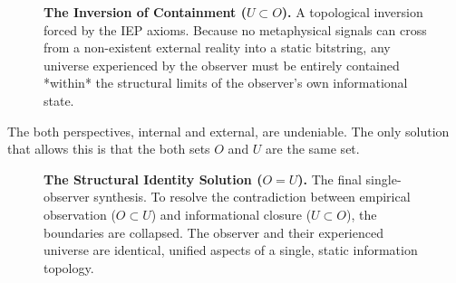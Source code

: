 \begin{figure}[htbp]
\centering
{}
\caption{\textbf{The Inversion of Containment ($U \subset O$).} A topological inversion forced by the IEP axioms. Because no metaphysical signals can cross from a non-existent external reality into a static bitstring, any universe experienced by the observer must be entirely contained *within* the structural limits of the observer's own informational state.}
\label{fig:diag2}
\end{figure}

\newpage

The both perspectives, internal and external, are undeniable. The
only solution that allows this is that the both sets $O$ and $U$
are the same set. 


\begin{figure}[htbp]
\centering
{}
\caption{\textbf{The Structural Identity Solution ($O = U$).} The final single-observer synthesis. To resolve the contradiction between empirical observation ($O \subset U$) and informational closure ($U \subset O$), the boundaries are collapsed. The observer and their experienced universe are identical, unified aspects of a single, static information topology.}
\label{fig:diag3}
\end{figure}

